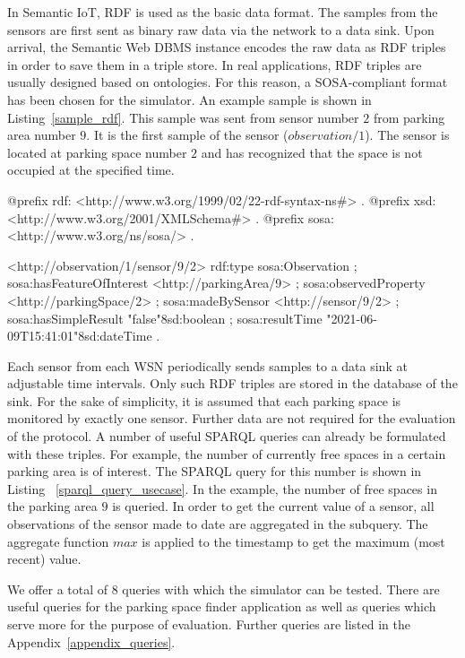 \documentclass[english,version-2019-11]{uzl-thesis}
\begin{document}
In Semantic IoT, RDF is used as the basic data format. The samples from the sensors are first sent as binary raw data via the network to a data sink. Upon arrival, the Semantic Web DBMS instance encodes the raw data as RDF triples in order to save them in a triple store. In real applications, RDF triples are usually designed based on ontologies. For this reason, a SOSA-compliant format has been chosen for the simulator. An example sample is shown in Listing~\ref{sample_rdf}. This sample was sent from sensor number $2$ from parking area number $9$. It is the first sample of the sensor ($observation/1$). The sensor is located at parking space number $2$ and has recognized that the space is not occupied at the specified time.
\begin{SPARQL}[caption={Example of a sample in RDF.},
  float, label=sample_rdf, morekeywords={@prefix}, captionpos=b]
@prefix rdf: <http://www.w3.org/1999/02/22-rdf-syntax-ns#> .
@prefix xsd: <http://www.w3.org/2001/XMLSchema#> .
@prefix sosa: <http://www.w3.org/ns/sosa/> .

<http://observation/1/sensor/9/2> rdf:type sosa:Observation ;
sosa:hasFeatureOfInterest <http://parkingArea/9> ;
sosa:observedProperty <http://parkingSpace/2> ;
sosa:madeBySensor <http://sensor/9/2> ;
sosa:hasSimpleResult "false"^^xsd:boolean ;
sosa:resultTime "2021-06-09T15:41:01"^^xsd:dateTime .
\end{SPARQL}

Each sensor from each WSN periodically sends samples to a data sink at adjustable time intervals. Only such RDF triples are stored in the database of the sink. For the sake of simplicity, it is assumed that each parking space is monitored by exactly one sensor. Further data are not required for the evaluation of the protocol. 
A number of useful SPARQL queries can already be formulated with these triples.
For example, the number of currently free spaces in a certain parking area is of interest. The SPARQL query for this number is shown in Listing ~\ref{sparql_query_usecase}.
In the example, the number of free spaces in the parking area $9$ is queried. In order to get the current value of a sensor, all observations of the sensor made to date are aggregated in the subquery. The aggregate function $max$ is applied to the timestamp to get the maximum (most recent) value.

We offer a total of 8 queries with which the simulator can be tested. There are useful queries for the parking space finder application as well as queries which serve more for the purpose of evaluation. Further queries are listed in the Appendix~\ref{appendix_queries}.
\end{document}
